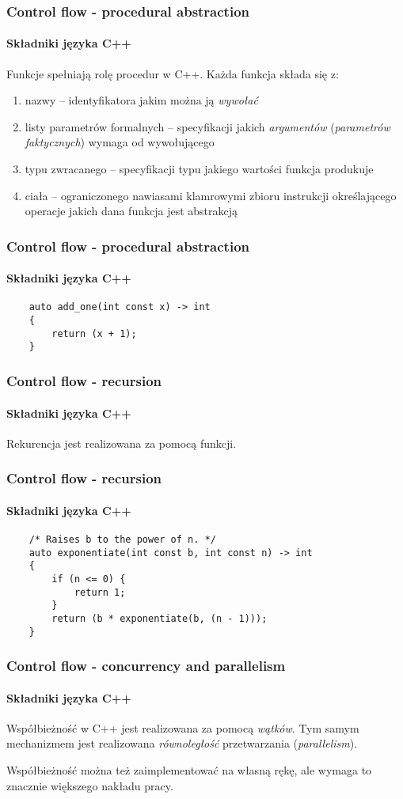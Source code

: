 \documentclass[aspectratio=169]{beamer}
\begin{document}
\begin{frame}
    \frametitle{Control flow - procedural abstraction}
    \framesubtitle{Składniki języka C++}

    Funkcje spełniają rolę procedur w C++. Każda funkcja składa się z:

    \begin{enumerate}
        \item nazwy -- identyfikatora jakim można ją \emph{wywołać}
        \item listy parametrów formalnych -- specyfikacji jakich
            \emph{argumentów} (\emph{parametrów faktycznych}) wymaga od
            wywołującego
        \item typu zwracanego -- specyfikacji typu jakiego wartości funkcja
            produkuje
        \item ciała -- ograniczonego nawiasami klamrowymi zbioru instrukcji
            określającego operacje jakich dana funkcja jest abstrakcją
    \end{enumerate}
\end{frame}

\begin{frame}[fragile]
    \frametitle{Control flow - procedural abstraction}
    \framesubtitle{Składniki języka C++}

    \begin{lstlisting}
    auto add_one(int const x) -> int
    {
        return (x + 1);
    }
    \end{lstlisting}
\end{frame}

\begin{frame}
    \frametitle{Control flow - recursion}
    \framesubtitle{Składniki języka C++}

    Rekurencja jest realizowana za pomocą funkcji.
\end{frame}

\begin{frame}[fragile]
    \frametitle{Control flow - recursion}
    \framesubtitle{Składniki języka C++}

    \begin{lstlisting}
    /* Raises b to the power of n. */
    auto exponentiate(int const b, int const n) -> int
    {
        if (n <= 0) {
            return 1;
        }
        return (b * exponentiate(b, (n - 1)));
    }
    \end{lstlisting}
\end{frame}

\begin{frame}
    \frametitle{Control flow - concurrency and parallelism}
    \framesubtitle{Składniki języka C++}

    Współbieżność w C++ jest realizowana za pomocą \emph{wątków}. Tym samym
    mechanizmem jest realizowana \emph{równoległość} przetwarzania
    (\emph{parallelism}).

    \vspace{1em}

    Współbieżność można też zaimplementować na własną rękę, ale wymaga to
    znacznie większego nakładu pracy.
\end{frame}
\end{document}
